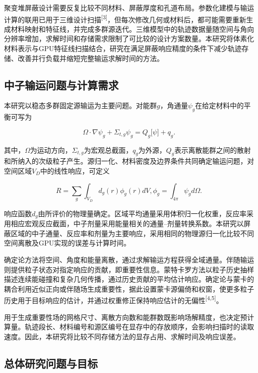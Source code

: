 \documentclass[UTF8, zihao=-4, fontset=none, a4paper]{ctexart}
\newcommand{\upcite}[1]{\textsuperscript{[#1]}}
\begin{document}
聚变堆屏蔽设计需要反复比较不同材料、屏蔽厚度和孔道布局。参数化建模与输运计算的联用已用于三维设计扫描\upcite{3}，但每次修改几何或材料后，都可能需要重新生成材料映射和特征线，并完成多群源迭代。三维模型中的轨迹数据量随空间与角向分辨率增加，求解时间和存储需求限制了可比较的设计方案数量。本研究将体素化材料表示与GPU特征线扫描结合，研究在满足屏蔽响应精度的条件下减少轨迹存储、改善并行负载并缩短完整输运求解时间的方法。

\subsection{中子输运问题与计算需求}

本研究以稳态多群固定源输运为主要问题。对能群\(g\)，角通量\(\psi_{g}\)在给定材料中的平衡可写为

\begin{equation}
\Omega \cdot \nabla\psi_{g} + \Sigma_{t,g}\psi_{g} = Q_{g}\lbrack\psi\rbrack + q_{g}.
\label{eq:1}
\end{equation}

其中，\(\Omega\)为运动方向，\(\Sigma_{t,g}\)为宏观总截面，\(q_{g}\)为外源，\(Q_{g}\)表示离散能群之间的散射和所纳入的次级粒子产生。源归一化、材料密度及边界条件共同确定输运问题，对空间区域\(V_{D}\)中的线性响应，可定义

\begin{equation}
R = \sum_{g}^{}{\int_{V_{D}}^{}{d_{g}(r)\phi_{g}(r)dV}},\phi_{g} = \int_{4\pi}^{}{\psi_{g}d\Omega}.
\label{eq:2}
\end{equation}

响应函数\(d_g\)由所评价的物理量确定。区域平均通量采用体积归一化权重，反应率采用相应宏观反应截面，中子剂量采用能量相关的通量--剂量转换系数。本研究以屏蔽区域的中子通量、反应率和剂量为主要响应，采用相同的物理源归一化比较不同空间离散及GPU实现的误差与计算时间。

确定论方法将空间、角度和能量离散，通过求解输运方程获得全域通量。伴随输运则提供粒子状态对指定响应的贡献，即重要性信息。蒙特卡罗方法以粒子历史抽样描述连续能碰撞和复杂几何传播，通过历史贡献的平均估计响应。确定论与蒙卡的耦合利用近似正向或伴随场生成重要性，据此设置蒙卡源偏倚和权窗，使更多粒子历史用于目标响应的估计，并通过权重修正保持响应估计的无偏性\upcite{4,5}。

用于生成重要性场的网格尺寸、离散方向数和能群数既影响场解精度，也决定预计算量。轨迹段长、材料编号和源区编号在显存中的存放顺序，会影响扫描时的读取速度。因此，本研究将比较不同存储方法的显存占用、求解时间及响应误差。

\subsection{总体研究问题与目标}
\end{document}
